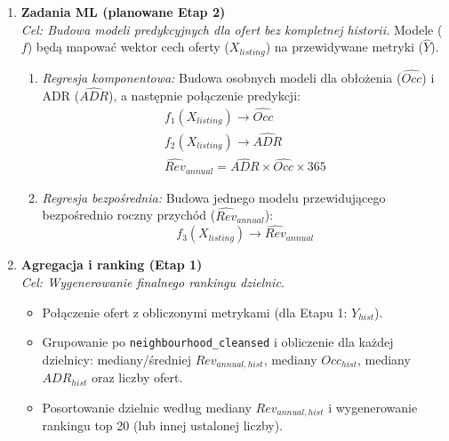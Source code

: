 \documentclass[a4paper,11pt]{article}
\begin{document}
\begin{enumerate}[label=\textbf{Zadanie \arabic*.}, leftmargin=*]
  \item \textbf{Zadania ML (planowane Etap 2)}\\
    \textit{Cel: Budowa modeli predykcyjnych dla ofert bez kompletnej historii.} Modele ($f$) będą mapować wektor cech oferty ($X_{listing}$) na przewidywane metryki ($\widehat{Y}$).
    \begin{enumerate}[label=\alph*),leftmargin=1.5cm]
      \item \textit{Regresja komponentowa:} Budowa osobnych modeli dla obłożenia ($\widehat{Occ}$) i ADR ($\widehat{ADR}$), a następnie połączenie predykcji:
        \begin{gather*} %
          f_1(X_{listing}) \rightarrow \widehat{Occ} \\
          f_2(X_{listing}) \rightarrow \widehat{ADR} \\
          \widehat{Rev}_{annual} = \widehat{ADR} \times \widehat{Occ} \times 365
        \end{gather*}
      \item \textit{Regresja bezpośrednia:} Budowa jednego modelu przewidującego bezpośrednio roczny przychód ($\widehat{Rev}_{annual}$):
        \begin{equation*} %
          f_3(X_{listing}) \rightarrow \widehat{Rev}_{annual}
        \end{equation*}
    \end{enumerate}


  \item \textbf{Agregacja i ranking (Etap 1)}\\
    \textit{Cel: Wygenerowanie finalnego rankingu dzielnic.}
    \begin{itemize}[label=$\square$,itemsep=3pt]
      \item Połączenie ofert z obliczonymi metrykami (dla Etapu 1: $Y_{hist}$).
      \item Grupowanie po \texttt{neighbourhood\_cleansed} i obliczenie dla każdej dzielnicy: mediany/średniej $Rev_{annual, hist}$, mediany $Occ_{hist}$, mediany $ADR_{hist}$ oraz liczby ofert.
      \item Posortowanie dzielnic według mediany $Rev_{annual, hist}$ i wygenerowanie rankingu top 20 (lub innej ustalonej liczby).
    \end{itemize}
\end{enumerate}

\vspace{0.5cm}
\end{document}
